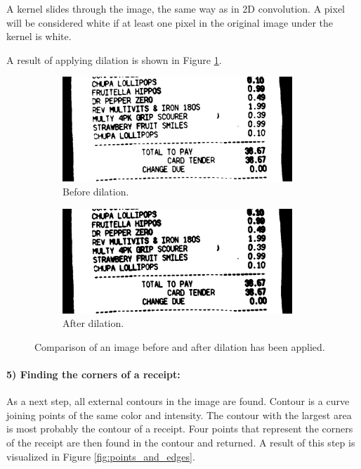 \documentclass[
  digital, %
  table,   %
  oneside, %
  lof,     %
  lot,     %
]{fithesis3}
\begin{document}
A kernel slides through the image, the same way as in 2D convolution. A pixel will be considered white if at least one pixel in the original image under the kernel is white.

A result of applying dilation is shown in Figure \ref{fig:dilation}.

\begin{figure}
    \centering
    \begin{subfigure}[t]{0.5\textwidth}
      \centering
      \includegraphics[width=0.95\textwidth]{figures/image_processing/before_dilation}
      \caption{Before dilation.}
    \end{subfigure}
    \begin{subfigure}[t]{0.5\textwidth}
      \centering
      \includegraphics[width=0.95\textwidth]{figures/image_processing/after_dilation}
      \caption{After dilation.}
    \end{subfigure}
    \caption{Comparison of an image before and after dilation has been applied.}
    \label{fig:dilation}
\end{figure}

\paragraph{5) Finding the corners of a receipt:} As a next step, all external contours in the image are found. Contour is a curve joining points of the same color and intensity. The contour with the largest area is most probably the contour of a receipt. Four points that represent the corners of the receipt are then found in the contour and returned. A result of this step is visualized in Figure \ref{fig:points_and_edges}.
\end{document}
